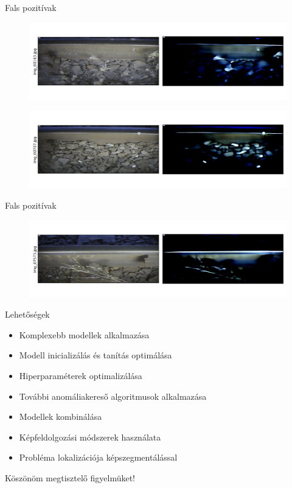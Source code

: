 \documentclass[aspectratio=169]{beamer}
\begin{document}
\begin{frame}{Fals pozitívak}
    \begin{figure}
        \centering
        \includegraphics[width=\textwidth,trim={0 1cm 0 1cm},clip]{./results/vgg19_vgg19_MAV/20230510_172958_predict_4.png}
    \end{figure}
    \begin{figure}
        \centering
        \includegraphics[width=\textwidth,trim={0 1cm 0 1cm},clip]{./results/vgg19_vgg19_MAV/20230510_172958_predict_5.png}
    \end{figure}
\end{frame}

\begin{frame}{Fals pozitívak}
    \begin{figure}
        \centering
        \includegraphics[width=\textwidth,trim={0 1cm 0 1cm},clip]{./results/vgg19_vgg19_MAV/20230510_172958_predict_6.png}
    \end{figure}
\end{frame}

\begin{frame}{Lehetőségek}
    \begin{itemize}
        \item Komplexebb modellek alkalmazása
        \item Modell inicializálás és tanítás optimálása
        \item Hiperparaméterek optimalizálása
        \item További anomáliakereső algoritmusok alkalmazása
        \item Modellek kombinálása
        \item Képfeldolgozási módszerek használata
        \item Probléma lokalizációja képszegmentálással
    \end{itemize}
\end{frame}

\begin{frame}
    \centering \Large
    Köszönöm megtisztelő figyelmüket!
\end{frame}
\end{document}
